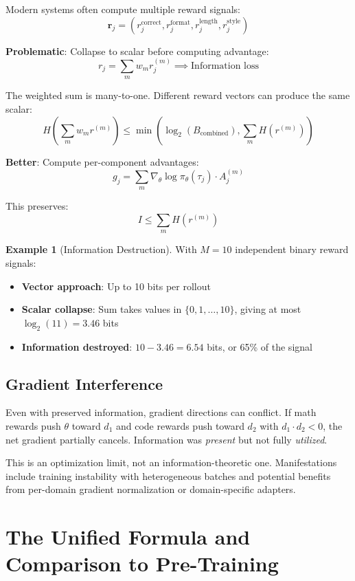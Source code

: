 \documentclass[11pt,a4paper]{article}
\theoremstyle{definition}
\newtheorem{example}[theorem]{Example}
\theoremstyle{remark}
\begin{document}
Modern systems often compute multiple reward signals:
\[
\mathbf{r}_j = (r_j^{\text{correct}}, r_j^{\text{format}}, r_j^{\text{length}}, r_j^{\text{style}})
\]

\textbf{Problematic}: Collapse to scalar before computing advantage:
\[
r_j = \sum_m w_m r_j^{(m)} \implies \text{Information loss}
\]

The weighted sum is many-to-one. Different reward vectors can produce the same scalar:
\[
H\left(\sum_m w_m r^{(m)}\right) \leq \min\left(\log_2(B_{\text{combined}}), \sum_m H(r^{(m)})\right)
\]

\textbf{Better}: Compute per-component advantages:
\[
g_j = \sum_m \nabla_\theta \log \pi_\theta(\tau_j) \cdot A_j^{(m)}
\]

This preserves:
\[
I \leq \sum_m H(r^{(m)})
\]

\begin{example}[Information Destruction]
With $M = 10$ independent binary reward signals:
\begin{itemize}
    \item \textbf{Vector approach}: Up to 10 bits per rollout
    \item \textbf{Scalar collapse}: Sum takes values in $\{0, 1, \ldots, 10\}$, giving at most $\log_2(11) = 3.46$ bits
    \item \textbf{Information destroyed}: $10 - 3.46 = 6.54$ bits, or 65\% of the signal
\end{itemize}
\end{example}

\subsection{Gradient Interference}

Even with preserved information, gradient directions can conflict. If math rewards push $\theta$ toward $d_1$ and code rewards push toward $d_2$ with $d_1 \cdot d_2 < 0$, the net gradient partially cancels. Information was \emph{present} but not fully \emph{utilized}.

This is an optimization limit, not an information-theoretic one. Manifestations include training instability with heterogeneous batches and potential benefits from per-domain gradient normalization or domain-specific adapters.

\section{The Unified Formula and Comparison to Pre-Training}
\label{sec:comparison}
\end{document}
